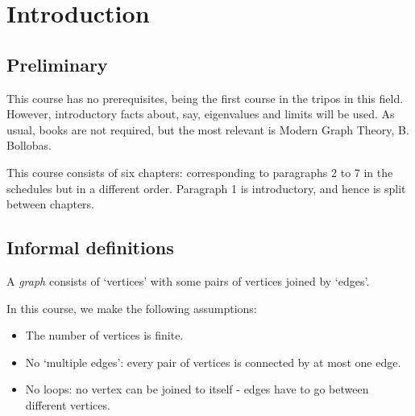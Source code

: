 \documentclass{article}
\begin{document}
\maketitle

\tableofcontents

\section{Introduction}

\subsection{Preliminary}
This course has no prerequisites, being the first course in the tripos in this field.  However, introductory facts about, say, eigenvalues and limits will be used.
As usual, books are not required, but the most relevant is Modern Graph Theory, B. Bollobas.

This course consists of six chapters: corresponding to paragraphs 2 to 7 in the schedules but in a different order. Paragraph 1 is introductory, and hence is split between chapters.

\subsection{Informal definitions}
A \emph{graph} consists of `vertices' with some pairs of vertices joined by `edges'.
\begin{center}
\end{center}
In this course, we make the following assumptions:
\begin{itemize}
    \item The number of vertices is finite.
    \item No `multiple edges': every pair of vertices is connected by at most one edge.
    \item No loops: no vertex can be joined to itself - edges have to go between different vertices.
\end{itemize}
\end{document}
